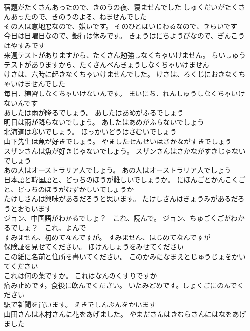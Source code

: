 \documentclass[8pt]{extreport}
\begin{document}
\begin{CJK}{UTF8}{min}
\\	宿題がたくさんあったので、きのうの夜、寝ませんでした	しゅくだいがたくさんあったので、きのうのよる、ねませんでした 
\\	その人は意地悪なので、嫌いです。	そのひとはいじわるなので、きらいです 
\\	今日は日曜日なので、銀行は休みです。	きょうはにちようびなので、ぎんこうはやすみです 
\\	来週テストがありますから、たくさん勉強しなくちゃいけません。	らいしゅうテストがありますから、たくさんべんきょうしなくちゃいけません 
\\	けさは、六時に起きなくちゃいけませんでした。	けさは、ろくじにおきなくちゃいけませんでした 
\\	毎日、練習しなくちゃいけないんです。	まいにち、れんしゅうしなくちゃいけないんです 
\\	あしたは雨が降るでしょう。	あしたはあめがふるでしょう 
\\	明日は雨が降らないでしょう。	あしたはあめがふらないでしょう 
\\	北海道は寒いでしょう。	ほっかいどうはさむいでしょう 
\\	山下先生は魚が好きでしょう。	やましたせんせいはさかながすきでしょう 
\\	スザンさんは魚が好きじゃないでしょう。	スザンさんはさかながすきじゃないでしょう 
\\	あの人はオーストラリア人でしょう。	あの人はオーストラリア人でしょう 
\\	日本語と韓国語と、どっちのほうが難しいでしょうか。	にほんごとかんこくごと、どっちのほうがむずかしいでしょうか 
\\	たけしさんは興味があるだろうと思います。	たけしさんはきょうみがあるだろうとおもいます 
\\	ジョン、中国語がわかるでしょ？　これ、読んで。	ジョン、ちゅごくごがわかるでしょ？　これ、よんで 
\\	すみません、初めてなんですが。	すみません、はじめてなんですが 
\\	保険証を見せてください。	ほけんしょうをみせてください 
\\	この紙に名前と住所を書いてください。	このかみになまえとじゅうじょをかいてください 
\\	これは何の薬ですか。	これはなんのくすりですか 
\\	痛み止めです。食後に飲んでください。	いたみどめです。しょくごにのんでください 
\\	駅で新聞を買います。	えきでしんぶんをかいます 
\\	山田さんは木村さんに花をあげました。	やまださんはきむらさんにはなをあげました 

\end{CJK}
\end{document}
